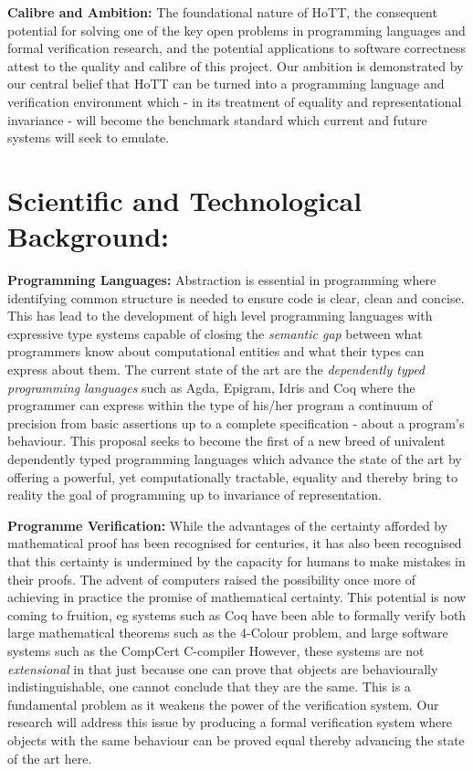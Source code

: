 \documentclass[a4paper,11pt]{article}
\begin{document}
{\bf Calibre and Ambition:} The foundational nature of HoTT, the
consequent potential for solving one of the key open problems in
programming languages and formal verification research, and the
potential applications to software correctness attest to the quality
and calibre of this project. Our ambition is demonstrated by our
central belief that HoTT can be turned into a programming language and
verification environment which - in its treatment of equality and
representational invariance - will become the benchmark standard which
current and future systems will seek to emulate.

\section{Scientific and Technological Background:}

{\bf Programming Languages:} Abstraction is essential in programming
where identifying common structure is needed to ensure code is clear,
clean and concise. This has lead to the development of high level
programming languages with expressive type systems capable of closing
the {\em semantic gap} between what programmers know about
computational entities and what their types can express about them.
The current state of the art are the {\em dependently typed
  programming languages} such as Agda, Epigram, Idris and Coq where
the programmer can express within the type of his/her program a
continuum of precision from basic assertions up to a complete
specification - about a program’s behaviour. This proposal seeks to
become the first of a new breed of univalent dependently typed
programming languages which advance the state of the art by offering a
powerful, yet computationally tractable, equality and thereby bring to
reality the goal of programming up to invariance of representation.


{\bf Programme Verification:} While the advantages of the certainty
afforded by mathematical proof has been recognised for centuries, it
has also been recognised that this certainty is undermined by the
capacity for humans to make mistakes in their proofs. The advent of
computers raised the possibility once more of achieving in practice
the promise of mathematical certainty. This potential is now coming to
fruition, eg systems such as Coq have been able to formally verify
both large mathematical theorems such as the 4-Colour problem, and
large software systems such as the CompCert C-compiler
However, these systems
are not {\em extensional} in that just because one can prove that
objects are behaviourally indistinguishable, one cannot conclude that
they are the same. This is a fundamental problem as it weakens the
power of the verification system. Our research will address this
issue by producing a formal verification system where objects with the
same behaviour can be proved equal thereby advancing the state of the
art here.
\end{document}

